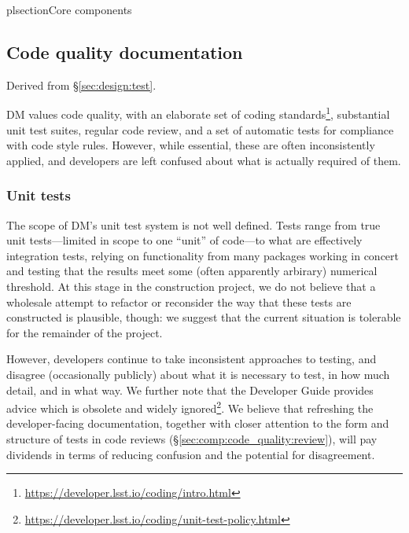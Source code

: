 plsection{Core components}
\label{sec:comp}







\subsection{Code quality documentation}
\label{sec:comp:code_quality}

Derived from \S\ref{sec:design:test}.

DM values code quality, with an elaborate set of coding standards\footnote{\url{https://developer.lsst.io/coding/intro.html}}, substantial unit test suites, regular code review, and a set of automatic tests for compliance with code style rules.
However, while essential, these are often inconsistently applied, and developers are left confused about what is actually required of them.

\subsubsection{Unit tests}
\label{sec:comp:code_quality:unittest}

The scope of DM's unit test system is not well defined.
Tests range from true unit tests---limited in scope to one ``unit'' of code---to what are effectively integration tests, relying on functionality from many packages working in concert and testing that the results meet some (often apparently arbirary) numerical threshold.
At this stage in the construction project, we do not believe that a wholesale attempt to refactor or reconsider the way that these tests are constructed is plausible, though: we suggest that the current situation is tolerable for the remainder of the project.

However, developers continue to take inconsistent approaches to testing, and disagree (occasionally publicly) about what it is necessary to test, in how much detail, and in what way.
We further note that the Developer Guide provides advice which is obsolete and widely ignored\footnote{\url{https://developer.lsst.io/coding/unit-test-policy.html}}.
We believe that refreshing the developer-facing documentation, together with closer attention to the form and structure of tests in code reviews (\S\ref{sec:comp:code_quality:review}), will pay dividends in terms of reducing confusion and the potential for disagreement.

